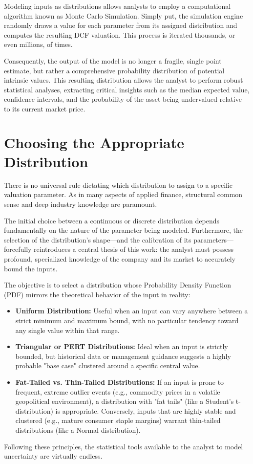 Modeling inputs as distributions allows analysts to employ a computational algorithm known as Monte Carlo Simulation. Simply put, the simulation engine randomly draws a value for each parameter from its assigned distribution and computes the resulting DCF valuation. This process is iterated thousands, or even millions, of times.

Consequently, the output of the model is no longer a fragile, single point estimate, but rather a comprehensive probability distribution of potential intrinsic values. This resulting distribution allows the analyst to perform robust statistical analyses, extracting critical insights such as the median expected value, confidence intervals, and the probability of the asset being undervalued relative to its current market price.

\section*{Choosing the Appropriate Distribution}

There is no universal rule dictating which distribution to assign to a specific valuation parameter. As in many aspects of applied finance, structural common sense and deep industry knowledge are paramount.

The initial choice between a continuous or discrete distribution depends fundamentally on the nature of the parameter being modeled. Furthermore, the selection of the distribution's shape—and the calibration of its parameters—forcefully reintroduces a central thesis of this work: the analyst must possess profound, specialized knowledge of the company and its market to accurately bound the inputs.

The objective is to select a distribution whose Probability Density Function (PDF) mirrors the theoretical behavior of the input in reality:
\begin{itemize}
    \item \textbf{Uniform Distribution:} Useful when an input can vary anywhere between a strict minimum and maximum bound, with no particular tendency toward any single value within that range.
    \item \textbf{Triangular or PERT Distributions:} Ideal when an input is strictly bounded, but historical data or management guidance suggests a highly probable "base case" clustered around a specific central value.
    \item \textbf{Fat-Tailed vs. Thin-Tailed Distributions:} If an input is prone to frequent, extreme outlier events (e.g., commodity prices in a volatile geopolitical environment), a distribution with "fat tails" (like a Student's t-distribution) is appropriate. Conversely, inputs that are highly stable and clustered (e.g., mature consumer staple margins) warrant thin-tailed distributions (like a Normal distribution).
\end{itemize}
Following these principles, the statistical tools available to the analyst to model uncertainty are virtually endless.

